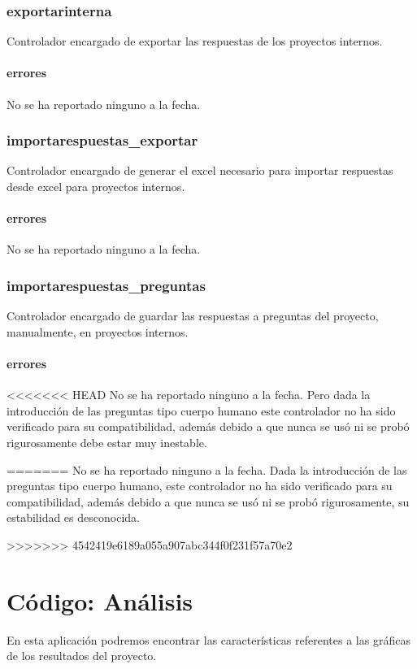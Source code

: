 \documentclass[10pt,a4paper]{book}
\begin{document}
	\subsection{exportarinterna}
	Controlador encargado de exportar las respuestas de los proyectos internos.
	\subsubsection{errores}
	No se ha reportado ninguno a la fecha.

	\subsection{importarespuestas\_exportar}
	Controlador encargado de generar el excel necesario para importar respuestas desde excel para proyectos internos.
	\subsubsection{errores}
	No se ha reportado ninguno a la fecha.

	\subsection{importarespuestas\_preguntas}
	Controlador encargado de guardar las respuestas a preguntas del proyecto, manualmente, en proyectos internos.
	\subsubsection{errores}
<<<<<<< HEAD
	No se ha reportado ninguno a la fecha. Pero dada la introducción de las preguntas tipo cuerpo humano este controlador no ha sido verificado para su compatibilidad, además debido a que nunca se usó ni se probó rigurosamente debe estar muy inestable.


=======
	No se ha reportado ninguno a la fecha. Dada la introducción de las preguntas tipo cuerpo humano, este controlador no ha sido verificado para su compatibilidad, además debido a que nunca se usó ni se probó rigurosamente, su estabilidad es desconocida.
	
	
>>>>>>> 4542419e6189a055a907abc344f0f231f57a70e2
	\chapter{Código: Análisis}

	En esta aplicación podremos encontrar las características referentes a las gráficas de los resultados del proyecto.
\end{document}
